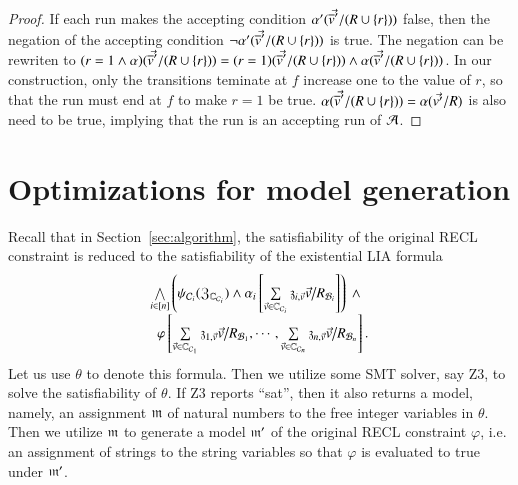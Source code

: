 {\begin{proof}
   If each run makes the accepting condition $\alpha'(\vec{\overline{v}'}/(R\cup\{r\}))$ false, then the negation of the accepting condition $\neg\alpha'(\vec{\overline{v}'}/(R\cup\{r\}))$ is true. The negation can be rewriten to $(r=1\wedge \alpha)(\vec{\overline{v}'}/(R\cup\{r\})) = (r=1)(\vec{\overline{v}'}/(R\cup\{r\}))\wedge \alpha(\vec{\overline{v}'}/(R\cup\{r\}))$. In our construction, only the transitions teminate at $f$ increase one to the value of $r$, so that the run must end at $f$ to make $r=1$ be true. $\alpha(\vec{\overline{v}'}/(R\cup\{r\})) = \alpha(\vec{v'}/R)$ is also need to be true, implying that the run is an accepting run of $\mathcal{A}$.
\end{proof}
}

\section{Optimizations for model generation}\label{sec-opt-sol-gen}

Recall that in Section~\ref{sec:algorithm}, the satisfiability of the original RECL constraint is reduced to the satisfiability of the existential LIA formula
\[
\begin{array}{l}
\bigwedge \limits_{i \in [n]} \left(\psi_{\cC_i}(\fZ_{\costset_{\cC_i}}) \wedge \alpha_i\left[\sum\limits_{\myvec{v} \in \costset_{\cC_i}} \anivarz_{i, \myvec{v}} \myvec{v} \big{/}R_{\cB_i}  \right] \right) \ \wedge \\
\ \ \varphi \left[ \sum\limits_{\myvec{v} \in \costset_{\cC_1}} \anivarz_{1, \myvec{v}} \myvec{v} \big{/}R_{\cB_1}, \cdots, \sum\limits_{\myvec{v} \in \costset_{\cC_n}} \anivarz_{n, \myvec{v}} \myvec{v} \big{/}R_{\cB_n} \right].
\end{array}
\]
Let us use $\theta$ to denote this formula. 
Then we utilize some SMT solver, say Z3, to solve the satisfiability of $\theta$. If Z3 reports ``sat'', then it also returns a model, namely, an assignment $\mathfrak{m}$ of natural numbers to the free integer variables in $\theta$. Then we utilize $\mathfrak{m}$ to generate a model $\mathfrak{m}'$ of the original RECL constraint $\varphi$, i.e. an assignment of strings to the string variables so that $\varphi$ is evaluated to true under $\mathfrak{m}'$. 

